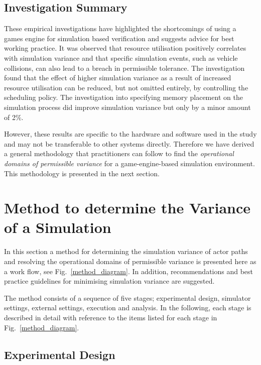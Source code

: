 \subsection{Investigation Summary} \label{s:empirical_summary} 
These empirical investigations have highlighted the shortcomings of using a games engine for simulation based verification and suggests advice for best working practice. It was observed that resource utilisation positively correlates with simulation variance and that specific simulation events, such as vehicle collisions, can also lead to a breach in permissible tolerance. The investigation found that the effect of higher simulation variance as a result of increased resource utilisation can be reduced, but not omitted entirely, by controlling the scheduling policy. The investigation into specifying memory placement on the simulation process did improve simulation variance but only by a minor amount of 2\%.

However, these results are specific to the hardware and software used in the study and may not be transferable to other systems directly. Therefore we have derived a general methodology that practitioners can follow to find the \textit{operational domains of permissible variance} for a game-engine-based simulation environment. This methodology is presented in the next section. 

\section{Method to determine the Variance of a Simulation} \label{s:methodology}
In this section a method for determining the simulation variance of actor paths and resolving the operational domains of permissible variance is presented here as a work flow, see Fig.~\ref{method_diagram}. In addition, recommendations and best practice guidelines for minimising simulation variance are suggested.

The method consists of a sequence of five stages; experimental design, simulator settings, external settings, execution and analysis. In the following, each stage is described in detail with reference to the items listed for each stage in Fig.~\ref{method_diagram}.

\subsection{Experimental Design}\label{s:design_experiment}

